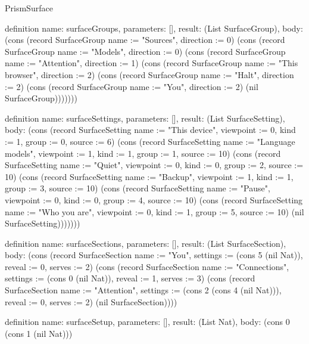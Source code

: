 \begin{lexlean}{PrismSurface}
\begin{semanticmodule}
{}

definition{
  name: surfaceGroups,
  parameters: [],
  result: (List SurfaceGroup),
  body: (cons (record SurfaceGroup {name := "Sources", direction := 0}) (cons (record SurfaceGroup {name := "Models", direction := 0}) (cons (record SurfaceGroup {name := "Attention", direction := 1}) (cons (record SurfaceGroup {name := "This browser", direction := 2}) (cons (record SurfaceGroup {name := "Halt", direction := 2}) (cons (record SurfaceGroup {name := "You", direction := 2}) (nil SurfaceGroup)))))))
}

definition{
  name: surfaceSettings,
  parameters: [],
  result: (List SurfaceSetting),
  body: (cons (record SurfaceSetting {name := "This device", viewpoint := 0, kind := 1, group := 0, source := 6}) (cons (record SurfaceSetting {name := "Language models", viewpoint := 1, kind := 1, group := 1, source := 10}) (cons (record SurfaceSetting {name := "Quiet", viewpoint := 0, kind := 0, group := 2, source := 10}) (cons (record SurfaceSetting {name := "Backup", viewpoint := 1, kind := 1, group := 3, source := 10}) (cons (record SurfaceSetting {name := "Pause", viewpoint := 0, kind := 0, group := 4, source := 10}) (cons (record SurfaceSetting {name := "Who you are", viewpoint := 0, kind := 1, group := 5, source := 10}) (nil SurfaceSetting)))))))
}

definition{
  name: surfaceSections,
  parameters: [],
  result: (List SurfaceSection),
  body: (cons (record SurfaceSection {name := "You", settings := (cons 5 (nil Nat)), reveal := 0, serves := 2}) (cons (record SurfaceSection {name := "Connections", settings := (cons 0 (nil Nat)), reveal := 1, serves := 3}) (cons (record SurfaceSection {name := "Attention", settings := (cons 2 (cons 4 (nil Nat))), reveal := 0, serves := 2}) (nil SurfaceSection))))
}

definition{
  name: surfaceSetup,
  parameters: [],
  result: (List Nat),
  body: (cons 0 (cons 1 (nil Nat)))
}


\end{semanticmodule}
\end{lexlean}
